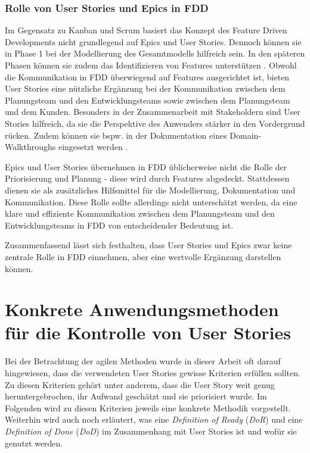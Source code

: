 \documentclass[acmtog]{acmart}
\begin{document}
\subsubsection{Rolle von User Stories und Epics in FDD}

Im Gegensatz zu Kanban und Scrum basiert das Konzept des Feature Driven Developments nicht grundlegend auf Epics und User Stories.
Dennoch können sie in Phase 1 bei der Modellierung des Gesamtmodells hilfreich sein.
In den späteren Phasen können sie zudem das Identifizieren von Features unterstützen \cite{hunt06}.
Obwohl die Kommunikation in FDD überwiegend auf Features ausgerichtet ist, bieten User Stories eine nützliche Ergänzung bei der Kommunikation zwischen dem Planungsteam und den Entwicklungsteams sowie zwischen dem Planungsteam und dem Kunden.
Besonders in der Zusammenarbeit mit Stakeholdern sind User Stories hilfreich, da sie die Perspektive des Anwenders stärker in den Vordergrund rücken.
Zudem können sie bspw. in der Dokumentation eines Domain-Walkthroughs eingesetzt werden \cite{palmer02}.

Epics und User Stories übernehmen in FDD üblicherweise nicht die Rolle der Priorisierung und Planung - diese wird durch Features abgedeckt. Stattdessen dienen sie als zusätzliches Hilfsmittel für die Modellierung, Dokumentation und Kommunikation. Diese Rolle sollte allerdings nicht unterschätzt werden, da eine klare und effiziente Kommunikation zwischen dem Planungsteam und den Entwicklungsteams in FDD von entscheidender Bedeutung ist.

Zusammenfassend lässt sich festhalten, dass User Stories und Epics zwar keine zentrale Rolle in FDD einnehmen, aber eine wertvolle Ergänzung darstellen können.

\section{Konkrete Anwendungsmethoden für die Kontrolle von User Stories} \label{sec:konkrete-anwendungsmethoden}

Bei der Betrachtung der agilen Methoden wurde in dieser Arbeit oft darauf hingewiesen, dass die verwendeten User Stories gewisse Kriterien 
erfüllen sollten. Zu diesen Kriterien gehört unter anderem, dass die User Story weit genug heruntergebrochen, ihr Aufwand geschätzt und sie priorisiert 
wurde. Im Folgenden wird zu diesen Kriterien jeweils eine konkrete Methodik vorgestellt. Weiterhin wird auch noch erläutert, was eine \emph{Definition of 
Ready} (\emph{DoR}) und eine \emph{Definition of Done} (\emph{DoD}) im Zusammenhang mit User Stories ist und wofür sie genutzt werden.
\end{document}
